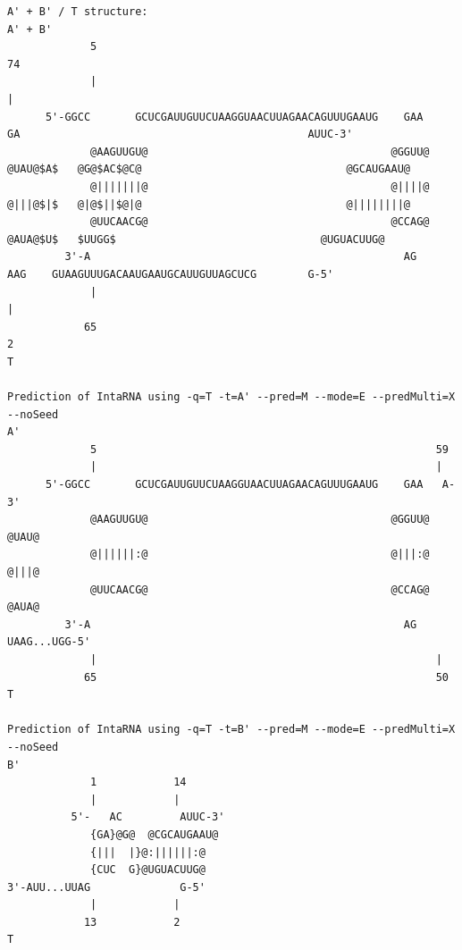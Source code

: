 \documentclass[11pt,a4paper]{report}
\begin{document}
\begin{landscape}
\begin{lstlisting}[style=base]
A' + B' / T structure:
A' + B'
             5                                                                                                     74
             |                                                                                                     |
      5'-GGCC       GCUCGAUUGUUCUAAGGUAACUUAGAACAGUUUGAAUG    GAA    GA                                             AUUC-3'
             @AAGUUGU@                                      @GGUU@   @UAU@$A$   @G@$AC$@C@                                @GCAUGAAU@
             @|||||||@                                      @||||@   @|||@$|$   @|@$||$@|@                                @||||||||@
             @UUCAACG@                                      @CCAG@   @AUA@$U$   $UUGG$                                @UGUACUUG@
         3'-A                                                 AG     AAG    GUAAGUUUGACAAUGAAUGCAUUGUUAGCUCG        G-5'
             |                                                                                                     |
            65                                                                                                     2
T

Prediction of IntaRNA using -q=T -t=A' --pred=M --mode=E --predMulti=X --noSeed
A'
             5                                                     59
             |                                                     |
      5'-GGCC       GCUCGAUUGUUCUAAGGUAACUUAGAACAGUUUGAAUG    GAA   A-3'
             @AAGUUGU@                                      @GGUU@   @UAU@
             @||||||:@                                      @|||:@   @|||@
             @UUCAACG@                                      @CCAG@   @AUA@
         3'-A                                                 AG    UAAG...UGG-5'
             |                                                     |
            65                                                     50
T

Prediction of IntaRNA using -q=T -t=B' --pred=M --mode=E --predMulti=X --noSeed
B'
             1            14
             |            |
          5'-   AC         AUUC-3'
             {GA}@G@  @CGCAUGAAU@
             {|||  |}@:||||||:@
             {CUC  G}@UGUACUUG@
3'-AUU...UUAG              G-5'
             |            |
            13            2
T

\end{lstlisting}
\label{Result:split}
\end{landscape}
\end{document}
